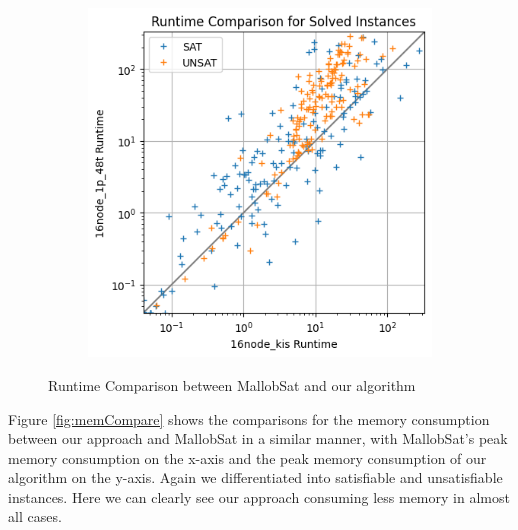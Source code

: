 \documentclass[12pt,a4paper,twoside]{scrartcl}
\numberwithin{equation}{section}
\begin{document}
\begin{figure}
\begin{subfigure}[c]{.4\textwidth}
    \label{fig:runtimeCompare4node}
  \end{subfigure}
  \begin{subfigure}[c]{.4\textwidth}
    \center
    \includegraphics[scale=.5]{plots/square_runtime_compare/square_runtime_16node.png}
    \label{fig:runtimeCompare16node}
  \end{subfigure}
  \caption{Runtime Comparison between MallobSat and our algorithm}
  \label{fig:runtimeCompare}
\end{figure}

Figure \ref{fig:memCompare} shows the comparisons for the memory consumption between our approach and MallobSat in a similar manner, with MallobSat's peak memory consumption on the x-axis and the peak memory consumption of our algorithm on the y-axis. Again we differentiated into satisfiable and unsatisfiable instances. Here we can clearly see our approach consuming less memory in almost all cases.
\end{document}
